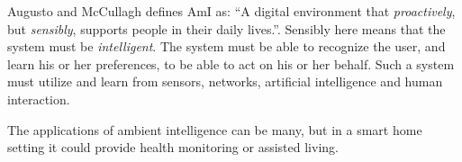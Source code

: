 Augusto and McCullagh \cite{augusto2007ambient} defines AmI as: ``A digital environment that \emph{proactively}, but \emph{sensibly}, supports people in their daily lives.''.
Sensibly here means that the system must be \emph{intelligent}. 
The system must be able to recognize the user, 
and learn his or her preferences,
to be able to act on his or her behalf. 
Such a system must utilize and learn from sensors, networks, artificial intelligence and human interaction. 

The applications of ambient intelligence can be many, 
but in a smart home setting it could provide health monitoring or assisted living\cite{acampora2013survey}.

